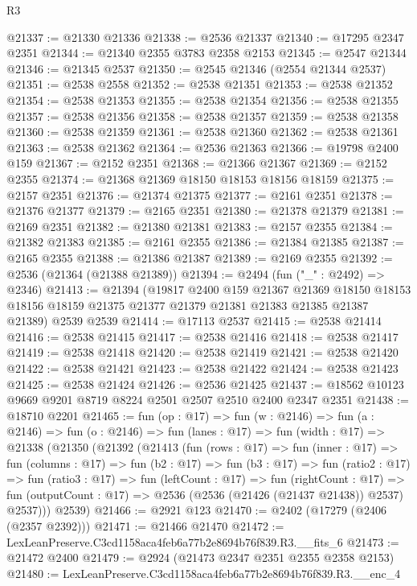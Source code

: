 \begin{lexlean}{R3}
\begin{coremodule}
@21337 := @21330 @21336
@21338 := @2536 @21337
@21340 := @17295 @2347 @2351
@21344 := @21340 @2355 @3783 @2358 @2153
@21345 := @2547 @21344
@21346 := @21345 @2537
@21350 := @2545 @21346 (@2554 @21344 @2537)
@21351 := @2538 @2558
@21352 := @2538 @21351
@21353 := @2538 @21352
@21354 := @2538 @21353
@21355 := @2538 @21354
@21356 := @2538 @21355
@21357 := @2538 @21356
@21358 := @2538 @21357
@21359 := @2538 @21358
@21360 := @2538 @21359
@21361 := @2538 @21360
@21362 := @2538 @21361
@21363 := @2538 @21362
@21364 := @2536 @21363
@21366 := @19798 @2400 @159
@21367 := @2152 @2351
@21368 := @21366 @21367
@21369 := @2152 @2355
@21374 := @21368 @21369 @18150 @18153 @18156 @18159
@21375 := @2157 @2351
@21376 := @21374 @21375
@21377 := @2161 @2351
@21378 := @21376 @21377
@21379 := @2165 @2351
@21380 := @21378 @21379
@21381 := @2169 @2351
@21382 := @21380 @21381
@21383 := @2157 @2355
@21384 := @21382 @21383
@21385 := @2161 @2355
@21386 := @21384 @21385
@21387 := @2165 @2355
@21388 := @21386 @21387
@21389 := @2169 @2355
@21392 := @2536 (@21364 (@21388 @21389))
@21394 := @2494 (fun ("_" : @2492) => @2346)
@21413 := @21394
    (@19817
      @2400
      @159
      @21367
      @21369
      @18150
      @18153
      @18156
      @18159
      @21375
      @21377
      @21379
      @21381
      @21383
      @21385
      @21387
      @21389)
    @2539
    @2539
@21414 := @17113 @2537
@21415 := @2538 @21414
@21416 := @2538 @21415
@21417 := @2538 @21416
@21418 := @2538 @21417
@21419 := @2538 @21418
@21420 := @2538 @21419
@21421 := @2538 @21420
@21422 := @2538 @21421
@21423 := @2538 @21422
@21424 := @2538 @21423
@21425 := @2538 @21424
@21426 := @2536 @21425
@21437 := @18562 @10123 @9669 @9201 @8719 @8224 @2501 @2507 @2510 @2400 @2347 @2351
@21438 := @18710 @2201
@21465 := fun (op : @17) =>
  fun (w : @2146) =>
  fun (a : @2146) =>
  fun (o : @2146) =>
  fun (lanes : @17) =>
  fun (width : @17) =>
  @21338
    (@21350
      (@21392
        (@21413
          (fun (rows : @17) =>
          fun (inner : @17) =>
          fun (columns : @17) =>
          fun (b2 : @17) =>
          fun (b3 : @17) =>
          fun (ratio2 : @17) =>
          fun (ratio3 : @17) =>
          fun (leftCount : @17) =>
          fun (rightCount : @17) =>
          fun (outputCount : @17) => @2536 (@2536 (@21426 (@21437 @21438)) @2537) @2537)))
      @2539)
@21466 := @2921 @123
@21470 := @2402 (@17279 (@2406 (@2357 @2392)))
@21471 := @21466 @21470
@21472 := LexLeanPreserve.C3cd1158aca4feb6a77b2e8694b76f839.R3.__fits_6
@21473 := @21472 @2400
@21479 := @2924 (@21473 @2347 @2351 @2355 @2358 @2153)
@21480 := LexLeanPreserve.C3cd1158aca4feb6a77b2e8694b76f839.R3.__enc_4

\end{coremodule}
\end{lexlean}
